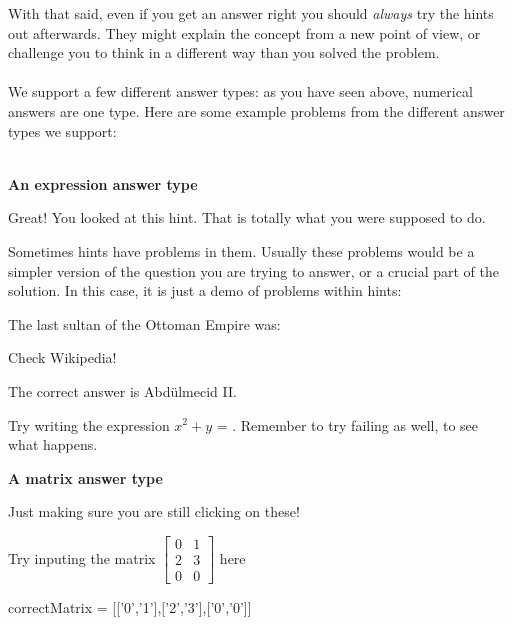 \documentclass{ximera}
\begin{document}
With that said, even if you get an answer right you should \textit{always} try the
hints out afterwards.  They might explain the concept from a new point
of view, or challenge you to think in a different way than you solved
the problem.
\\
\\
We support a few different answer types: as you have seen above,
numerical answers are one type.  Here are some example problems from
the different answer types we support:
\\
\\
\begin{question}
  \textbf{An expression answer type}
  \begin{solution}
    \begin{hint}
      Great!  You looked at this hint.  That is totally what you were supposed to do.
    \end{hint}
    \begin{hint}
      Sometimes hints have problems in them.  Usually these problems would be a simpler version of the question you are trying to answer,
      or a crucial part of the solution.  In this case, it is just a demo of problems within hints:
      \begin{question}
        The last sultan of the Ottoman Empire was:
        \begin{solution}
          \begin{hint}
            Check Wikipedia!
          \end{hint}
          \begin{hint}
            The correct answer is Abdülmecid II.
          \end{hint}
          \begin{multiple-choice}
          \end{multiple-choice}
        \end{solution}
      \end{question}
    \end{hint}
    Try writing the expression $x^2+y$ = .  Remember to try failing as well, to see what happens.
  \end{solution}
\end{question}

\begin{question}
  \textbf{A matrix answer type}
  \begin{solution}
    \begin{hint}
      Just making sure you are still clicking on these!
    \end{hint}
    Try inputing the matrix $\begin{bmatrix}  0&1\\2&3\\0&0\end{bmatrix}$ here
    \begin{matrix-answer}[name=M]
      correctMatrix = [['0','1'],['2','3'],['0','0']]
    \end{matrix-answer}
  \end{solution}
\end{question}
\end{document}
